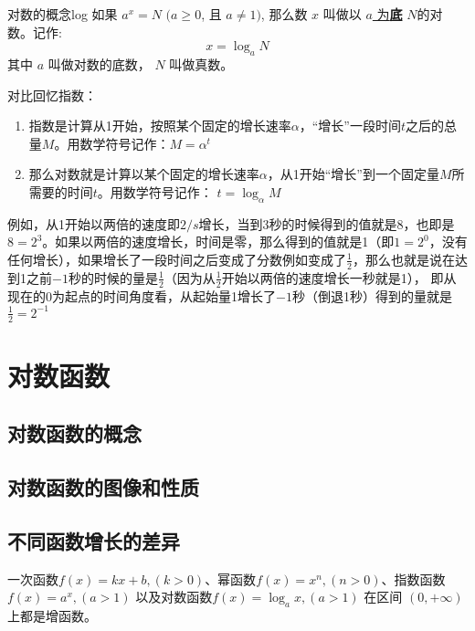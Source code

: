 \begin{definition}{对数的概念}{log}
如果 $a^x=N$ $(a \geq 0$, 且 $a \neq 1)$, 那么数 $x$ 叫做以 \underline{$a$ 为\textbf{底}} $N$的对数。记作:
\begin{equation}
x=\log_{a}{N}
\end{equation}
其中 $a$ 叫做对数的底数， $N$ 叫做真数。
\end{definition}

\begin{note}
对比回忆指数：
\begin{enumerate}
\item 指数是计算从1开始，按照某个固定的增长速率$\alpha$，“增长”一段时间$t$之后的总量$M$。用数学符号记作：$M=\alpha^t$
\item 那么对数就是计算以某个固定的增长速率$\alpha$，从1开始“增长”到一个固定量$M$所需要的时间$t$。用数学符号记作： $t=\log_{\alpha}{M}$
\end{enumerate}
例如，从1开始以两倍的速度即$2/s$增长，当到3秒的时候得到的值就是8，也即是$8=2^3$。如果以两倍的速度增长，时间是零，那么得到的值就是1（即$1=2^0$，没有任何增长），如果增长了一段时间之后变成了分数例如变成了$ \frac{1}{2}$，那么也就是说在达到1之前$-1$秒的时候的量是$\frac{1}{2}$（因为从$ \frac{1}{2}$开始以两倍的速度增长一秒就是1）， 即从现在的$0$为起点的时间角度看，从起始量1增长了$-1$秒（倒退1秒）得到的量就是$\frac{1}{2} = 2^{-1}$
\end{note}
\section{对数函数}

\subsection{对数函数的概念}

\subsection{对数函数的图像和性质}

\subsection{不同函数增长的差异}

一次函数$f(x)=kx+b, (k>0)$、幂函数$f(x)=x^n, (n>0)$、指数函数$f(x)=a^x, (a>1)$ 以及对数函数$f(x)=\log_{a}{x}, (a > 1)$ 在区间 $(0, +\infty)$上都是增函数。


